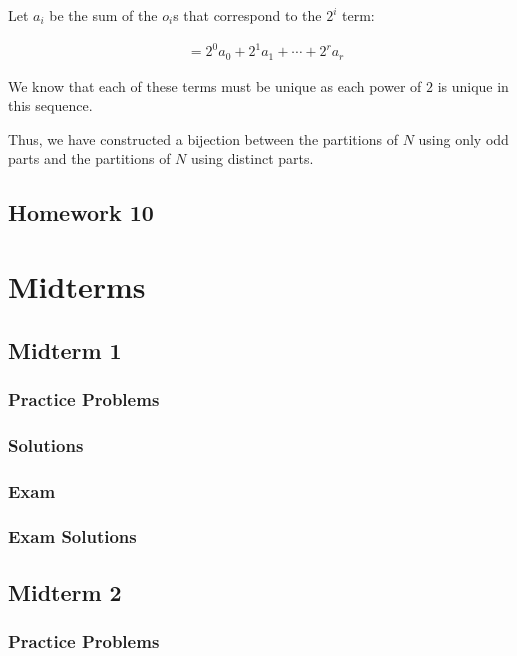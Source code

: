 \documentclass{report}
\begin{document}
{{    Let $a_i$ be the sum of the $o_i$s that correspond to the $2^i$ term:

    \begin{align*}
         & = 2^0 a_0 + 2^1 a_1 + \cdots + 2^{r} a_r
    \end{align*}

    We know that each of these terms must be unique as each power of $2$ is unique in this sequence.

    Thus, we have constructed a bijection between the partitions of $N$ using only odd parts
    and the partitions of $N$ using distinct parts.
}

\section{Homework 10}

\chapter{Midterms}

\section{Midterm 1}

\subsection{Practice Problems}

\subsection{Solutions}

\subsection{Exam}

\subsection{Exam Solutions}

\section{Midterm 2}

\subsection{Practice Problems}

}
\end{document}
